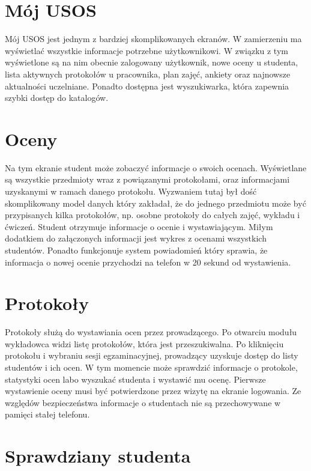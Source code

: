 \documentclass{pracamgr}
\begin{document}
\section{Mój USOS}

Mój USOS jest jednym z bardziej skomplikowanych ekranów. W zamierzeniu ma wyświetlać
wszystkie informacje potrzebne użytkownikowi. W związku z tym wyświetlone są na nim
obecnie zalogowany użytkownik, nowe oceny u studenta, lista aktywnych protokołów u
pracownika, plan zajęć, ankiety oraz najnowsze aktualności uczelniane. Ponadto
dostępna jest wyszukiwarka, która zapewnia szybki dostęp do katalogów.

\section{Oceny}

Na tym ekranie student może zobaczyć informacje o swoich ocenach. Wyświetlane są
wszystkie przedmioty wraz z powiązanymi protokołami, oraz informacjami uzyskanymi
w ramach danego protokołu. Wyzwaniem tutaj był dość skomplikowany model danych który
zakładał, że do jednego przedmiotu może być przypisanych kilka protokołów, np. osobne
protokoły do całych zajęć, wykładu i ćwiczeń. Student otrzymuje informacje o ocenie
i wystawiającym. Miłym dodatkiem do załączonych informacji jest wykres z ocenami
wszystkich studentów. Ponadto funkcjonuje system powiadomień który sprawia, że
informacja o nowej ocenie przychodzi na telefon w 20 sekund od wystawienia.

\section{Protokoły}

Protokoły służą do wystawiania ocen przez prowadzącego. Po otwarciu modułu wykładowca
widzi listę protokołów, która jest przeszukiwalna. Po kliknięciu protokołu i wybraniu
sesji egzaminacyjnej, prowadzący uzyskuje dostęp do listy studentów i ich ocen. W tym
momencie może sprawdzić informacje o protokole, statystyki ocen labo wyszukać
studenta i wystawić mu ocenę. Pierwsze wystawienie oceny musi być potwierdzone przez
wizytę na ekranie logowania. Ze względów bezpieczeństwa informacje o studentach nie
są przechowywane w pamięci stałej telefonu.

\section{Sprawdziany studenta}
\end{document}
